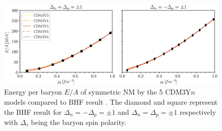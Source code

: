 \begin{figure}[t]
        \centering
        \includegraphics[width=\textwidth]{fig/BHF_fit.eps}
        \caption{Energy per baryon $E/A$ of symmetric \gls{NM} by the 5 CDM3Y$n$ models compared to \gls{BHF} result \citep{vidana2002equation}. The diamond and square represent the \gls{BHF} result for $\Delta_n=-\Delta_p=\pm 1$ and $\Delta_n=\Delta_p=\pm 1$ respectively with $\Delta_\tau$ being the baryon spin polarity.}
        \label{fig:bhf}
\end{figure} 

